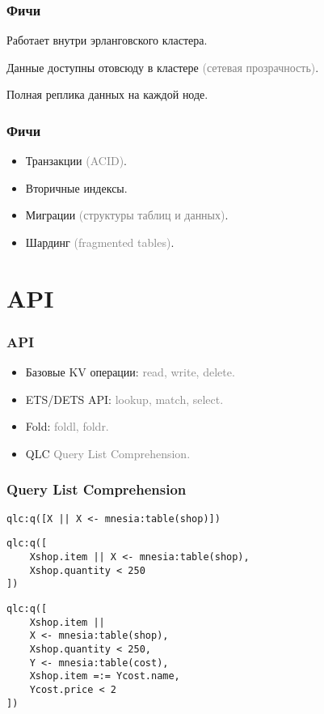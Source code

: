 \documentclass[10pt]{beamer}
\begin{document}
\begin{frame}
\frametitle{Фичи}
\centering
Работает внутри эрланговского кластера.
\par
\bigskip
Данные доступны отовсюду в кластере \textcolor{gray}{(сетевая прозрачность)}.
\par
\bigskip
Полная реплика данных на каждой ноде.
\end{frame}

\begin{frame}
\frametitle{Фичи}
\begin{itemize}
\item Транзакции \textcolor{gray}{(ACID)}.
\item Вторичные индексы.
\item Миграции \textcolor{gray}{(структуры таблиц и данных)}.
\item Шардинг \textcolor{gray}{(fragmented tables)}.
\end{itemize}
\end{frame}

\section{API}

\begin{frame}
\frametitle{API}
\begin{itemize}[<+->]
\item Базовые KV операции:\newline
  \textcolor{gray}{read, write, delete.}
\item ETS/DETS API:\newline
  \textcolor{gray}{lookup, match, select.}
\item Fold:\newline
  \textcolor{gray}{foldl, foldr.}
\item QLC\newline
  \textcolor{gray}{Query List Comprehension.}
\end{itemize}
\end{frame}

\begin{frame}[fragile]
\frametitle{Query List Comprehension}
\begin{lstlisting}
qlc:q([X || X <- mnesia:table(shop)])
\end{lstlisting}
\begin{lstlisting}
qlc:q([
    Xshop.item || X <- mnesia:table(shop),
    Xshop.quantity < 250
])
\end{lstlisting}
\begin{lstlisting}
qlc:q([
    Xshop.item ||
    X <- mnesia:table(shop),
    Xshop.quantity < 250,
    Y <- mnesia:table(cost),
    Xshop.item =:= Ycost.name,
    Ycost.price < 2
])
\end{lstlisting}
\end{frame}
\end{document}

